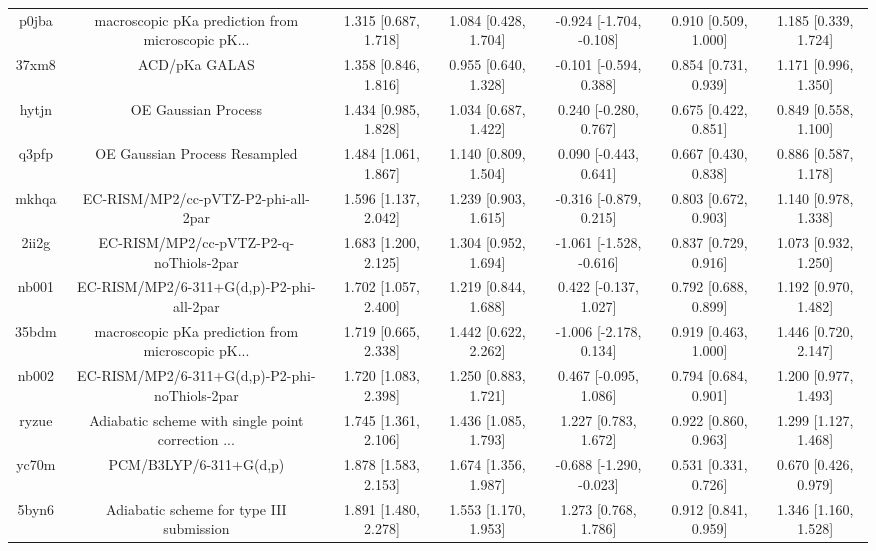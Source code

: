 \documentclass{article}
\begin{document}
\begin{center}
\begin{longtable}{|ccccccc|}
 p0jba &  macroscopic pKa prediction from microscopic pK... &  1.315 [0.687, 1.718] &  1.084 [0.428, 1.704] &  -0.924 [-1.704, -0.108] &  0.910 [0.509, 1.000] &   1.185 [0.339, 1.724] \\
 37xm8 &                                      ACD/pKa GALAS &  1.358 [0.846, 1.816] &  0.955 [0.640, 1.328] &   -0.101 [-0.594, 0.388] &  0.854 [0.731, 0.939] &   1.171 [0.996, 1.350] \\
 hytjn &                                OE Gaussian Process &  1.434 [0.985, 1.828] &  1.034 [0.687, 1.422] &    0.240 [-0.280, 0.767] &  0.675 [0.422, 0.851] &   0.849 [0.558, 1.100] \\
 q3pfp &                      OE Gaussian Process Resampled &  1.484 [1.061, 1.867] &  1.140 [0.809, 1.504] &    0.090 [-0.443, 0.641] &  0.667 [0.430, 0.838] &   0.886 [0.587, 1.178] \\
 mkhqa &                EC-RISM/MP2/cc-pVTZ-P2-phi-all-2par &  1.596 [1.137, 2.042] &  1.239 [0.903, 1.615] &   -0.316 [-0.879, 0.215] &  0.803 [0.672, 0.903] &   1.140 [0.978, 1.338] \\
 2ii2g &             EC-RISM/MP2/cc-pVTZ-P2-q-noThiols-2par &  1.683 [1.200, 2.125] &  1.304 [0.952, 1.694] &  -1.061 [-1.528, -0.616] &  0.837 [0.729, 0.916] &   1.073 [0.932, 1.250] \\
 nb001 &           EC-RISM/MP2/6-311+G(d,p)-P2-phi-all-2par &  1.702 [1.057, 2.400] &  1.219 [0.844, 1.688] &    0.422 [-0.137, 1.027] &  0.792 [0.688, 0.899] &   1.192 [0.970, 1.482] \\
 35bdm &  macroscopic pKa prediction from microscopic pK... &  1.719 [0.665, 2.338] &  1.442 [0.622, 2.262] &   -1.006 [-2.178, 0.134] &  0.919 [0.463, 1.000] &   1.446 [0.720, 2.147] \\
 nb002 &      EC-RISM/MP2/6-311+G(d,p)-P2-phi-noThiols-2par &  1.720 [1.083, 2.398] &  1.250 [0.883, 1.721] &    0.467 [-0.095, 1.086] &  0.794 [0.684, 0.901] &   1.200 [0.977, 1.493] \\
 ryzue &  Adiabatic scheme with single point correction ... &  1.745 [1.361, 2.106] &  1.436 [1.085, 1.793] &     1.227 [0.783, 1.672] &  0.922 [0.860, 0.963] &   1.299 [1.127, 1.468] \\
 yc70m &                             PCM/B3LYP/6-311+G(d,p) &  1.878 [1.583, 2.153] &  1.674 [1.356, 1.987] &  -0.688 [-1.290, -0.023] &  0.531 [0.331, 0.726] &   0.670 [0.426, 0.979] \\
 5byn6 &           Adiabatic scheme for type III submission &  1.891 [1.480, 2.278] &  1.553 [1.170, 1.953] &     1.273 [0.768, 1.786] &  0.912 [0.841, 0.959] &   1.346 [1.160, 1.528] \\

\end{longtable}
\end{center}
\end{document}
